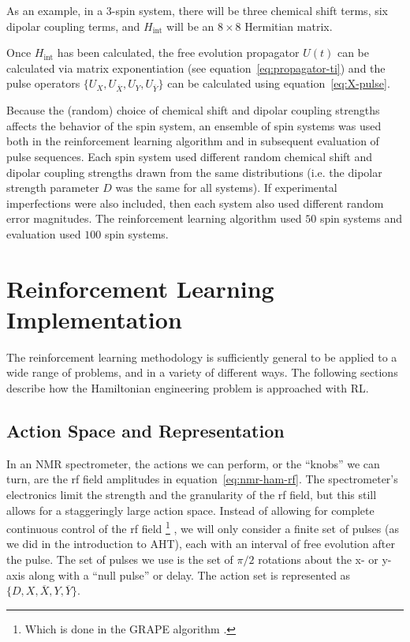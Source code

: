 As an example, in a $3$-spin system, there will be three chemical shift terms, six dipolar coupling terms, and $H_{\text{int}}$ will be an $8
\times 8$ Hermitian matrix.

Once $H_{\text{int}}$ has been calculated, the free evolution propagator $U(t)$ can be calculated via matrix exponentiation (see equation~\ref{eq:propagator-ti})
and
the pulse operators $\{ U_X, U_{\overline{X}}, U_Y, U_{\overline{Y}} \}$ can be calculated using equation~\ref{eq:X-pulse}.

Because the (random) choice of chemical shift and dipolar coupling strengths affects the behavior of the spin system, an ensemble of spin systems was used both in the reinforcement learning algorithm and in subsequent evaluation of pulse sequences.
Each spin system used different random chemical shift and dipolar coupling strengths drawn from the same distributions (i.e. the dipolar strength parameter $D$ was the same for all systems). If experimental imperfections were also included, then each system also used different random error magnitudes.
The reinforcement learning algorithm used $50$ spin systems and evaluation used $100$ spin systems.

\section{Reinforcement Learning Implementation}

The reinforcement learning methodology is sufficiently general to be applied to a wide range of problems, and in a variety of different ways.  The following sections describe how the Hamiltonian engineering problem is approached with RL.

\subsection{Action Space and Representation}

In an NMR spectrometer, the actions we can perform, or the ``knobs'' we can turn, are the rf field amplitudes in equation~\ref{eq:nmr-ham-rf}.
The spectrometer's electronics limit the strength and the granularity of the rf field,
but this still allows for a staggeringly large action space. Instead of allowing for complete continuous control of the rf field%
\footnote{
Which is done in the GRAPE algorithm \cite{Khaneja-2005}.
}
, we will only consider a finite set of pulses (as we did in the introduction to AHT), each with an interval of free evolution after the pulse. The set of pulses we use is the set of $\pi/2$ rotations about the x- or y-axis along with a ``null pulse'' or delay. The action set is represented as $\{ D, X, \overline{X}, Y, \overline{Y} \}$.



